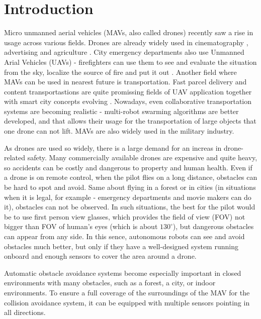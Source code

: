 \chapter{Introduction}

\label{chapter:intro}

Micro unmanned aerial vehicles (MAVs, also called drones) recently saw a rise in usage across various fields. 
Drones are already widely used in cinematography \cite{Mademlis2020}, advertising \cite{Ullah2021} and agriculture \cite{Kim2019}. 
City emergency departments also use Unmanned Arial Vehicles (UAVs) - firefighters can use them to see and evaluate the situation from the sky, localize the source of fire and put it out \cite{Pritzl2021}.
Another field where MAVs can be used in nearest future is transportation. 
Fast parcel delivery \cite{She2021} and content transportastions \cite{Gupta2021,Aloqaily2022} are quite promissing fields of UAV application together with smart city concepts evolving \cite{Ortiz2019}.
Nowadays, even collaborative transportation systems are becoming realistic - multi-robot swarming algorithms are better developed, and that allows their usage for the transportation of large objects \cite{Bacelar2020} that one drone can not lift. 
MAVs are also widely used in the military industry.

As drones are used so widely, there is a large demand for an increas in drone-related safety. 
Many commercially available drones are expensive and quite heavy, so accidents can be costly and dangerous to property and human health. 
Even if a drone is on remote control, when the pilot flies on a long distance, obstacles can be hard to spot and avoid.
Same about flying in a forest or in cities (in situations when it is legal, for example - emergency departments and movie makers can do it), obstacles can not be observed.
In such situations, the best for the pilot would be to use first person view glasses, which provides the field of view (FOV) not bigger than FOV of human's eyes (which is about $130^\circ$), but dangerous obstacles can appear from any side.
In this sence, autonomous robots can see and avoid obstacles much better, but only if they have a well-designed system running onboard and enough sensors to cover the area around a drone.

Automatic obstacle avoidance systems become especially important in closed environments with many obstacles, such as a forest, a city, or indoor environments.
To ensure a full coverage of the surroundings of the MAV for the collision avoidance system, it can be equipped with multiple sensors pointing in all directions.

